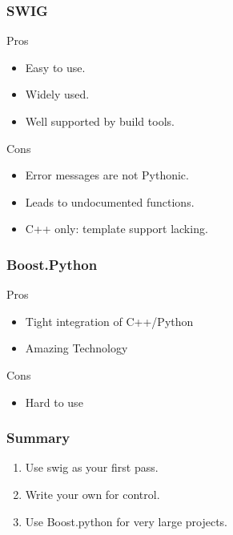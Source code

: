 \begin{frame}[fragile]
\frametitle{SWIG}
\begin{block}{Pros}
\begin{itemize}
\item Easy to use.
\item Widely used.
\item Well supported by build tools.
\end{itemize}
\end{block}

\begin{block}{Cons}
\begin{itemize}
\item Error messages are not Pythonic.
\item Leads to undocumented functions.
\item \alert{C++ only:} template support lacking.
\end{itemize}
\end{block}
\end{frame}

\begin{frame}[fragile]
\frametitle{Boost.Python}
\begin{block}{Pros}
\begin{itemize}
\item Tight integration of C++/Python
\item Amazing Technology
\end{itemize}
\end{block}

\begin{block}{Cons}
\begin{itemize}
\item Hard to use
\end{itemize}
\end{block}
\end{frame}

\begin{frame}[fragile]
\frametitle{Summary}
\begin{enumerate}
\item Use \alert{swig} as your first pass.
\item Write your own for control.
\item Use Boost.python for very large projects.
\end{enumerate}
\end{frame}

